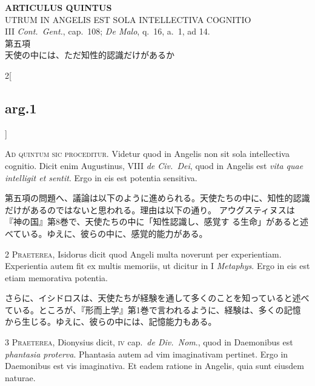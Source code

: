 \documentclass[paper=a4paper,fontsize=10pt,jafontsize=9pt,titlepage]{jlreq}
\begin{document}
\begin{center}
 {\Large {\bfseries ARTICULUS QUINTUS}}\\
 {\large UTRUM IN ANGELIS EST SOLA INTELLECTIVA COGNITIO}\\
 {\footnotesize III {\itshape Cont.~Gent.}, cap.~108; {\itshape De
 Malo}, q.~16, a.~1, ad 14.}\\
 {\Large 第五項\\天使の中には、ただ知性的認識だけがあるか}
\end{center}

\begin{paracol}{2}[\subsection{arg.1}]

{\huge A}{\scshape d quintum sic proceditur}. Videtur quod in
Angelis non sit sola intellectiva cognitio. Dicit enim Augustinus, VIII
{\itshape de Civ.~Dei}, quod in Angelis est {\itshape vita quae intelligit et sentit}. Ergo in
eis est potentia sensitiva.

\switchcolumn

第五項の問題へ、議論は以下のように進められる。天使たちの中に、知性的認識
 だけがあるのではないと思われる。理由は以下の通り。
アウグスティヌスは『神の国』第8巻で、天使たちの中に「知性認識し、感覚す
 る生命」があると述べている。ゆえに、彼らの中に、感覚的能力がある。


{\scshape  2 Praeterea}, Isidorus dicit quod Angeli multa
noverunt per experientiam. Experientia autem fit ex multis memoriis, ut
dicitur in I {\itshape Metaphys}. Ergo in eis est etiam memorativa potentia.

\switchcolumn

さらに、イシドロスは、天使たちが経験を通して多くのことを知っていると述べ
 ている。ところが、『形而上学』第1巻で言われるように、経験は、多くの記憶
 から生じる。ゆえに、彼らの中には、記憶能力もある。


{\scshape  3 Praeterea}, Dionysius dicit, {\scshape iv} cap.~{\itshape de
Div.~Nom}., quod in Daemonibus est {\itshape phantasia proterva}. Phantasia autem ad
vim imaginativam pertinet. Ergo in Daemonibus est vis imaginativa. Et
eadem ratione in Angelis, quia sunt eiusdem naturae.


\end{paracol}
\end{document}
